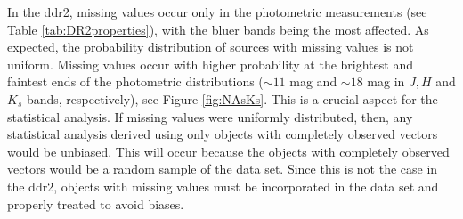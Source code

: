 In the \gls{ddr2}, missing values occur only in the photometric measurements (see Table \ref{tab:DR2properties}), with the bluer bands being the most affected. As expected, the probability distribution of sources with missing values is not {uniform}. Missing values occur with higher probability at the brightest and faintest ends of the photometric distributions ($\sim 11$ mag and $\sim 18$ mag in $J,H$ and $K_s$ bands, respectively), see Figure \ref{fig:NAsKs}. This is a crucial aspect for the statistical analysis. If missing values were {uniformly} distributed, then, any statistical analysis derived using only objects with completely observed vectors would be unbiased. This will occur because the objects with completely observed vectors would be a random sample of the data set. {Since this is not the case in the \gls{ddr2}, objects with missing values must be incorporated in the data set and properly treated to avoid biases.} 

